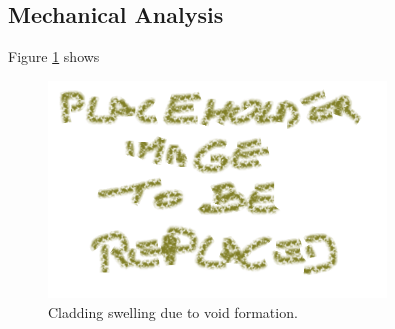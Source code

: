 \subsection{Mechanical Analysis}
Figure \ref{fig:mech_analysis} shows 

\begin{figure}[H]
\centering
\includegraphics[width=0.8\textwidth]{placeholder.png}
\caption{Cladding swelling due to void formation.}
\label{fig:mech_analysis}
\end{figure}
